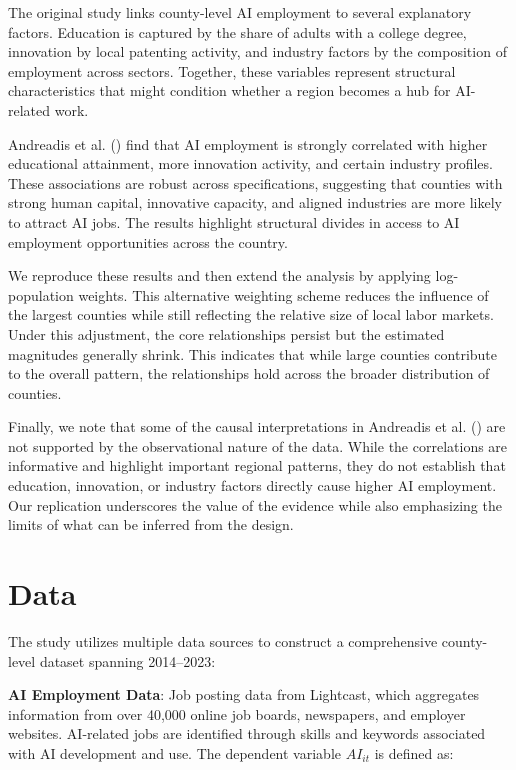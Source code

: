\documentclass[
]{article}
\begin{document}
The original study links county-level AI employment to several
explanatory factors. Education is captured by the share of adults with a
college degree, innovation by local patenting activity, and industry
factors by the composition of employment across sectors. Together, these
variables represent structural characteristics that might condition
whether a region becomes a hub for AI-related work.

Andreadis et al. () find that AI
employment is strongly correlated with higher educational attainment,
more innovation activity, and certain industry profiles. These
associations are robust across specifications, suggesting that counties
with strong human capital, innovative capacity, and aligned industries
are more likely to attract AI jobs. The results highlight structural
divides in access to AI employment opportunities across the country.

We reproduce these results and then extend the analysis by applying
log-population weights. This alternative weighting scheme reduces the
influence of the largest counties while still reflecting the relative
size of local labor markets. Under this adjustment, the core
relationships persist but the estimated magnitudes generally shrink.
This indicates that while large counties contribute to the overall
pattern, the relationships hold across the broader distribution of
counties.

Finally, we note that some of the causal interpretations in Andreadis et
al. () are not supported by the
observational nature of the data. While the correlations are informative
and highlight important regional patterns, they do not establish that
education, innovation, or industry factors directly cause higher AI
employment. Our replication underscores the value of the evidence while
also emphasizing the limits of what can be inferred from the design.

\section{Data}\label{data}

The study utilizes multiple data sources to construct a comprehensive
county-level dataset spanning 2014--2023:

\textbf{AI Employment Data}: Job posting data from Lightcast, which
aggregates information from over 40,000 online job boards, newspapers,
and employer websites. AI-related jobs are identified through skills and
keywords associated with AI development and use. The dependent variable
\(AI_{it}\) is defined as:
\end{document}
